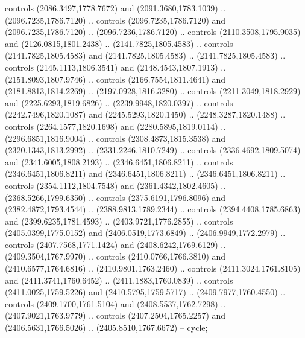 \begin{scope}[shift={(19.44451,-318.97965)}]
\begin{scope}[shift={(-2093.8013,-1176.4989)}]
\begin{scope}
\begin{scope}
          controls (2086.3497,1778.7672) and (2091.3680,1783.1039) ..
          (2096.7235,1786.7120) .. controls (2096.7235,1786.7120) and
          (2096.7235,1786.7120) .. (2096.7236,1786.7120) .. controls
          (2110.3508,1795.9035) and (2126.0815,1801.2438) .. (2141.7825,1805.4583) ..
          controls (2141.7825,1805.4583) and (2141.7825,1805.4583) ..
          (2141.7825,1805.4583) .. controls (2145.1113,1806.3541) and
          (2148.4543,1807.1913) .. (2151.8093,1807.9746) .. controls
          (2166.7554,1811.4641) and (2181.8813,1814.2269) .. (2197.0928,1816.3280) ..
          controls (2211.3049,1818.2929) and (2225.6293,1819.6826) ..
          (2239.9948,1820.0397) .. controls (2242.7496,1820.1087) and
          (2245.5293,1820.1450) .. (2248.3287,1820.1488) .. controls
          (2264.1577,1820.1698) and (2280.5895,1819.0114) .. (2296.6851,1816.9004) ..
          controls (2308.4873,1815.3538) and (2320.1343,1813.2992) ..
          (2331.2246,1810.7249) .. controls (2336.4692,1809.5074) and
          (2341.6005,1808.2193) .. (2346.6451,1806.8211) .. controls
          (2346.6451,1806.8211) and (2346.6451,1806.8211) .. (2346.6451,1806.8211) ..
          controls (2354.1112,1804.7548) and (2361.4342,1802.4605) ..
          (2368.5266,1799.6350) .. controls (2375.6191,1796.8096) and
          (2382.4872,1793.4544) .. (2388.9813,1789.2344) .. controls
          (2394.4408,1785.6863) and (2399.6235,1781.4593) .. (2403.9721,1776.2855) ..
          controls (2405.0399,1775.0152) and (2406.0519,1773.6849) ..
          (2406.9949,1772.2979) .. controls (2407.7568,1771.1424) and
          (2408.6242,1769.6129) .. (2409.3504,1767.9970) .. controls
          (2410.0766,1766.3810) and (2410.6577,1764.6816) .. (2410.9801,1763.2460) ..
          controls (2411.3024,1761.8105) and (2411.3741,1760.6452) ..
          (2411.1883,1760.0839) .. controls (2411.0025,1759.5226) and
          (2410.5795,1759.5717) .. (2409.7977,1760.4550) .. controls
          (2409.1700,1761.5104) and (2408.5537,1762.7298) .. (2407.9021,1763.9779) ..
          controls (2407.2504,1765.2257) and (2406.5631,1766.5026) ..
          (2405.8510,1767.6672) -- cycle;


\end{scope}
\end{scope}
\end{scope}
\end{scope}
